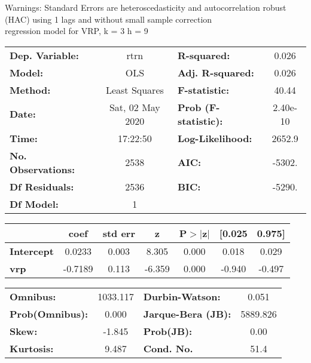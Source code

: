 Warnings: \newline
 [1] Standard Errors are heteroscedasticity and autocorrelation robust (HAC) using 1 lags and without small sample correction\\ 

regression model for VRP, k = 3 h = 9\begin{center}
\begin{tabular}{lclc}
\toprule
\textbf{Dep. Variable:}    &       rtrn       & \textbf{  R-squared:         } &     0.026   \\
\textbf{Model:}            &       OLS        & \textbf{  Adj. R-squared:    } &     0.026   \\
\textbf{Method:}           &  Least Squares   & \textbf{  F-statistic:       } &     40.44   \\
\textbf{Date:}             & Sat, 02 May 2020 & \textbf{  Prob (F-statistic):} &  2.40e-10   \\
\textbf{Time:}             &     17:22:50     & \textbf{  Log-Likelihood:    } &    2652.9   \\
\textbf{No. Observations:} &        2538      & \textbf{  AIC:               } &    -5302.   \\
\textbf{Df Residuals:}     &        2536      & \textbf{  BIC:               } &    -5290.   \\
\textbf{Df Model:}         &           1      & \textbf{                     } &             \\
\bottomrule
\end{tabular}
\begin{tabular}{lcccccc}
                   & \textbf{coef} & \textbf{std err} & \textbf{z} & \textbf{P$> |$z$|$} & \textbf{[0.025} & \textbf{0.975]}  \\
\midrule
\textbf{Intercept} &       0.0233  &        0.003     &     8.305  &         0.000        &        0.018    &        0.029     \\
\textbf{vrp}       &      -0.7189  &        0.113     &    -6.359  &         0.000        &       -0.940    &       -0.497     \\
\bottomrule
\end{tabular}
\begin{tabular}{lclc}
\textbf{Omnibus:}       & 1033.117 & \textbf{  Durbin-Watson:     } &    0.051  \\
\textbf{Prob(Omnibus):} &   0.000  & \textbf{  Jarque-Bera (JB):  } & 5889.826  \\
\textbf{Skew:}          &  -1.845  & \textbf{  Prob(JB):          } &     0.00  \\
\textbf{Kurtosis:}      &   9.487  & \textbf{  Cond. No.          } &     51.4  \\
\bottomrule
\end{tabular}
\end{center}

